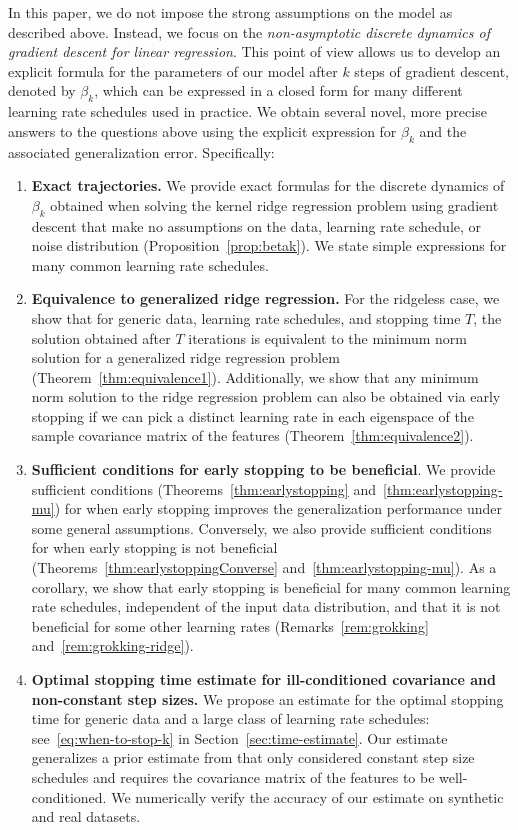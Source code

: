\documentclass[11pt]{article}
\begin{document}
In this paper, we do not impose the strong assumptions on the model as described above. Instead, we focus on the \emph{non-asymptotic discrete dynamics of gradient descent for linear regression}. This point of view allows us to develop an explicit formula for the parameters of our model after $k$ steps of gradient descent, denoted by $\beta_k$, which can be expressed in a closed form for many different learning rate schedules used in practice. We obtain several novel, more precise answers to the questions above using the explicit expression for $\beta_k$ and the associated generalization error. Specifically:
\begin{enumerate}
    \item \textbf{Exact trajectories.}
    We provide exact formulas for the discrete dynamics of $\beta_k$ obtained when solving the kernel ridge regression problem using gradient descent that make no assumptions on the data, learning rate schedule, or noise distribution (Proposition~\ref{prop:betak}). We state simple expressions for many common learning rate schedules.
    
    \item \textbf{Equivalence to generalized ridge regression.}
    For the ridgeless case, we show that for generic data, learning rate schedules, and stopping time $T$, the solution obtained after $T$ iterations is equivalent to the minimum norm solution for a generalized ridge regression problem (Theorem~\ref{thm:equivalence1}). Additionally, we show that any minimum norm solution to the ridge regression problem can also be obtained via early stopping if we can pick a distinct learning rate in each eigenspace of the sample covariance matrix of the features (Theorem~\ref{thm:equivalence2}).
    
    \item \textbf{Sufficient conditions for early stopping to be beneficial}.
    We provide sufficient conditions (Theorems~\ref{thm:earlystopping} and~\ref{thm:earlystopping-mu}) for when early stopping improves the generalization performance under some general assumptions. Conversely, we also provide sufficient conditions for when early stopping is not beneficial (Theorems~\ref{thm:earlystoppingConverse} and~\ref{thm:earlystopping-mu}). As a corollary, we show that early stopping is beneficial for many common learning rate schedules, independent of the input data distribution, and that it is not beneficial for some other learning rates (Remarks~\ref{rem:grokking} and~\ref{rem:grokking-ridge}).
    
    \item \textbf{Optimal stopping time estimate for ill-conditioned covariance and non-constant step sizes.}
    We propose an estimate for the optimal stopping time for generic data and a large class of learning rate schedules: see~\eqref{eq:when-to-stop-k} in Section~\ref{sec:time-estimate}. Our estimate generalizes a prior estimate from \cite{AdSaSo2020} that only considered constant step size schedules and requires the covariance matrix of the features to be well-conditioned. We numerically verify the accuracy of our estimate on synthetic and real datasets.
\end{enumerate}
\end{document}
